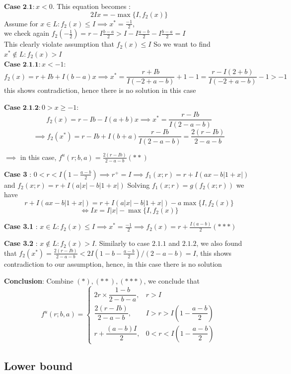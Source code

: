 \documentclass[notitlepage,reqno,11pt]{amsart}
\numberwithin{equation}{section}
\begin{document}
$\textbf{Case 2.1}:x<0$. This equation becomes : 
\[ 2Ix = - \max\{ I,f_2(x)\} \]
Assume for $x \in L : f_2(x) \le I \implies x^* = \frac{-1}{2}$, \\we check again $f_2(-\frac{1}{2}) = r - I \frac{b-a}{2 } > I - I \frac{a-b}{2} - I\frac{b-a}{2}  = I $ \\
This clearly violate assumption that $f_2(x) \le I$
So we want to find $x^* \notin L : f_2(x) > I  $\\
$\textbf{Case 2.1.1} : x<-1 :$
\[ f_2(x) = r + Ib+I(b-a)x  \implies x^* = \frac{r+Ib}{I(-2+a-b)} +1 -1  = \frac{r -I(2+b)}{I(-2+a-b)} -1 > -1  \]
this shows contradiction, hence there is no solution in this case

$\textbf{Case 2.1.2}: 0> x\ge -1$:
\[f_2(x) = r - Ib - I(a+b)x \implies x^* = \frac{r-Ib}{I(2-a-b)}  \]\[ \implies f_2(x^*) = r- Ib + I (b+a) \frac{r-Ib}{I(2-a-b)} =  \frac{2(r-Ib)}{2-a-b}\]

$\implies$ in this case, $f^u(r;b,a) = \frac{2(r-Ib)}{2-a-b}(**) $

\textbf{Case 3 }: $0<r<I(1-\frac{a-b}{2})  \implies r^+ = I \implies f_1(x;r) = r +I (ax - b|1+x|) $ and $f_2(x;r) = r+I(a|x| - b|1+x|)$ 
Solving $f_1(x;r) = g(f_2(x;r)) $ we have 
\[ r+ I(ax - b|1+x|)  = r+ I(a|x| - b|1+x|) - a \max \{ I, f_2(x) \}\]
\[\iff  I x =I|x| -\max \{ I, f_2(x) \}  \]

\textbf{Case 3.1} : $x \in L : f_2(x) \le I \implies  x^* = \frac{-1}{2} \implies f_2(x) = r + \frac{I(a-b)}{2}(***)$

\textbf{Case 3.2 } : $ x\notin L : f_2(x) > I$. Similarly to case $2.1.1$ and $2.1.2$, we also found that $f_2(x^*) =  \frac{2(r-Ib)}{2-a-b} < 2I( 1-b-\frac{a-b}{2}) / (2-a-b) = I$, this shows contradiction to our assumption, hence, in this case there is no solution

\textbf{Conclusion}: Combine $(*), (**),(***)$, we conclude that 
\[
f^u(r; b, a) =
\begin{cases}
  2r \times \dfrac{1-b}{2-b-a}, & r > I \\[1.2em]
  \dfrac{2(r - Ib)}{2-a-b}, & I > r > I\left(1 - \dfrac{a-b}{2}\right) \\[1.2em]
  r + \dfrac{(a-b)I}{2}, & 0 < r < I\left(1 - \dfrac{a-b}{2}\right)
\end{cases}
\]


\subsection{Lower bound}
\end{document}
